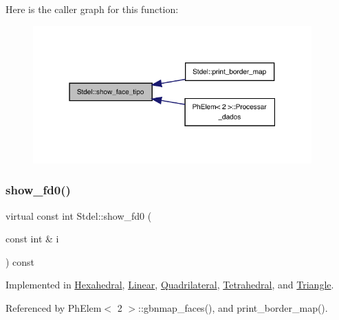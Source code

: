 Here is the caller graph for this function\+:
\nopagebreak
\begin{figure}[H]
\begin{center}
\leavevmode
\includegraphics[width=304pt]{classStdel_ae76b0893dabd93ae9f86a9ed445852ba_icgraph}
\end{center}
\end{figure}
\mbox{\label{classStdel_a0e05ccae64925915af5f07c91d61c7bc}} 
\subsubsection{\texorpdfstring{show\+\_\+fd0()}{show\_fd0()}}
{\footnotesize\ttfamily virtual const int Stdel\+::show\+\_\+fd0 (\begin{DoxyParamCaption}\item[{const int \&}]{i }\end{DoxyParamCaption}) const\hspace{0.3cm}{\ttfamily [pure virtual]}}



Implemented in \hyperlink{classHexahedral_a370ec08c7979d9bcca581ee5b4759285}{Hexahedral}, \hyperlink{classLinear_a1bbad0d40ac2e1d16097e1510ce19c07}{Linear}, \hyperlink{classQuadrilateral_a37f35e0253b296804417fdbb087d155c}{Quadrilateral}, \hyperlink{classTetrahedral_abf123907219bb126731b6aae4bd3be11}{Tetrahedral}, and \hyperlink{classTriangle_a715ce8022208f6b23e980acced093e99}{Triangle}.



Referenced by Ph\+Elem$<$ 2 $>$\+::gbnmap\+\_\+faces(), and print\+\_\+border\+\_\+map().

